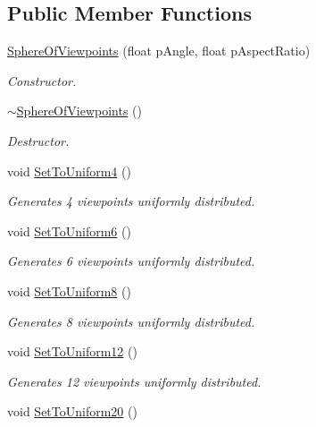 \subsection*{Public Member Functions}
\begin{DoxyCompactItemize}
\item 
\hyperlink{class_sphere_of_viewpoints_a8025953ca2ac4d4c53664d1263d3c7c5}{Sphere\+Of\+Viewpoints} (float p\+Angle, float p\+Aspect\+Ratio)
\begin{DoxyCompactList}\small\item\em Constructor. \end{DoxyCompactList}\item 
\hyperlink{class_sphere_of_viewpoints_a97b38d25bd8b17e72951deb40a1198ea}{$\sim$\+Sphere\+Of\+Viewpoints} ()
\begin{DoxyCompactList}\small\item\em Destructor. \end{DoxyCompactList}\item 
void \hyperlink{class_sphere_of_viewpoints_a0cd05612e10d64749d27329bec1f25a2}{Set\+To\+Uniform4} ()
\begin{DoxyCompactList}\small\item\em Generates 4 viewpoints uniformly distributed. \end{DoxyCompactList}\item 
void \hyperlink{class_sphere_of_viewpoints_a7b2fbc9bffe8548cd9005c4a9fa7e188}{Set\+To\+Uniform6} ()
\begin{DoxyCompactList}\small\item\em Generates 6 viewpoints uniformly distributed. \end{DoxyCompactList}\item 
void \hyperlink{class_sphere_of_viewpoints_a4bd55d7b106b47750177c2dc263199a3}{Set\+To\+Uniform8} ()
\begin{DoxyCompactList}\small\item\em Generates 8 viewpoints uniformly distributed. \end{DoxyCompactList}\item 
void \hyperlink{class_sphere_of_viewpoints_a0a37e67f77de4a8202ae4a3bb30f67e0}{Set\+To\+Uniform12} ()
\begin{DoxyCompactList}\small\item\em Generates 12 viewpoints uniformly distributed. \end{DoxyCompactList}\item 
void \hyperlink{class_sphere_of_viewpoints_a5e3dcf71d581ccb0d2c03c847757b8a1}{Set\+To\+Uniform20} ()

\end{DoxyCompactItemize}
